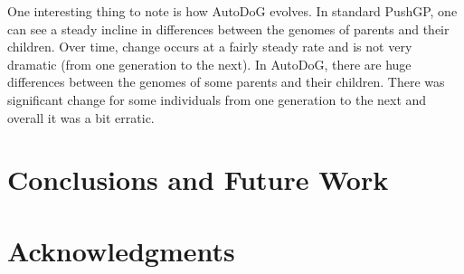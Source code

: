 \documentclass{sig-alternate}
\begin{document}

One interesting thing to note is how AutoDoG evolves. In standard PushGP, one can see a steady incline in differences between the genomes of parents and their children. Over time, change occurs at a fairly steady rate and is not very dramatic (from one generation to the next). In AutoDoG, there are huge differences between the genomes of some parents and their children. There was significant change for some individuals from one generation to the next and overall it was a bit erratic.
\section{Conclusions and Future Work}
\label{sec:conclusion}

\section{Acknowledgments}
\label{sec:acknowledgments}



  

\end{document}
